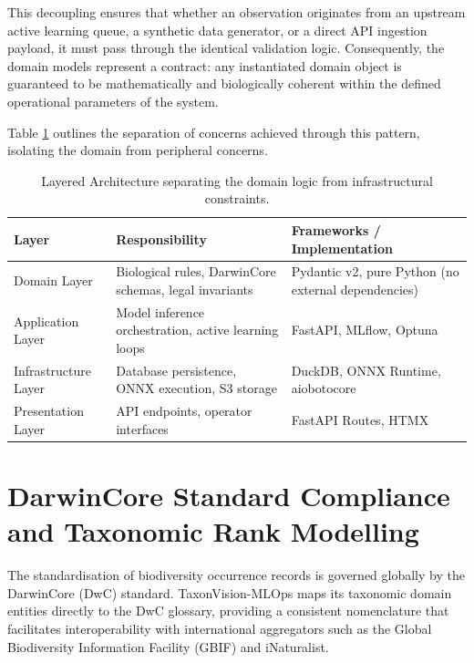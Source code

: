 This decoupling ensures that whether an observation originates from an upstream active learning queue, a synthetic data generator, or a direct API ingestion payload, it must pass through the identical validation logic. Consequently, the domain models represent a contract: any instantiated domain object is guaranteed to be mathematically and biologically coherent within the defined operational parameters of the system.

Table \ref{tab:ddd_layers} outlines the separation of concerns achieved through this pattern, isolating the domain from peripheral concerns.

\begin{table}[h]
\centering
\begin{tabularx}{\textwidth}{@{}llX@{}}
\toprule
\textbf{Layer} & \textbf{Responsibility} & \textbf{Frameworks / Implementation} \\
\midrule
Domain Layer & Biological rules, DarwinCore schemas, legal invariants & Pydantic v2, pure Python (no external dependencies) \\
Application Layer & Model inference orchestration, active learning loops & FastAPI, MLflow, Optuna \\
Infrastructure Layer & Database persistence, ONNX execution, S3 storage & DuckDB, ONNX Runtime, aiobotocore \\
Presentation Layer & API endpoints, operator interfaces & FastAPI Routes, HTMX \\
\bottomrule
\end{tabularx}
\caption{Layered Architecture separating the domain logic from infrastructural constraints.}
\label{tab:ddd_layers}
\end{table}

\section[DarwinCore Standard Compliance and Taxonomic Rank Modelling]{DarwinCore Standard Compliance\\and Taxonomic Rank Modelling}
\label{sec:darwincore_schema}

The standardisation of biodiversity occurrence records is governed globally by the DarwinCore (DwC) standard. TaxonVision-MLOps maps its taxonomic domain entities directly to the DwC glossary, providing a consistent nomenclature that facilitates interoperability with international aggregators such as the Global Biodiversity Information Facility (GBIF) and iNaturalist.


